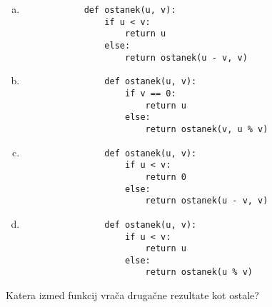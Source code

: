 \documentclass[arhiv, 10pt]{../izpit}
\begin{document}
        \begin{multicols}{2}
        \begin{enumerate}[(a)]
\item 
            \begin{verbatim}
            def ostanek(u, v):
                if u < v:
                    return u
                else:
                    return ostanek(u - v, v)
            \end{verbatim}
        
\item 
                \begin{verbatim}
                def ostanek(u, v):
                    if v == 0:
                        return u
                    else:
                        return ostanek(v, u % v)
                \end{verbatim}
            
\item 
                \begin{verbatim}
                def ostanek(u, v):
                    if u < v:
                        return 0
                    else:
                        return ostanek(u - v, v)
                \end{verbatim}
            
\item 
                \begin{verbatim}
                def ostanek(u, v):
                    if u < v:
                        return u
                    else:
                        return ostanek(u % v)
                \end{verbatim}
            
\end{enumerate}

        \end{multicols}
    
        \naloga*
        
        Katera izmed funkcij vrača drugačne rezultate kot ostale?
    
\end{document}
